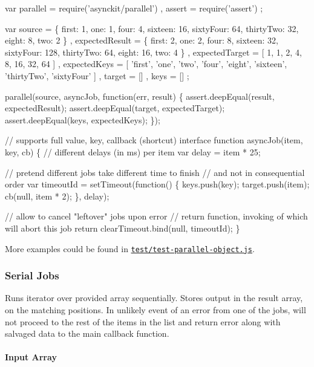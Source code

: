 \begin{DoxyCode}
var parallel = require('asynckit/parallel')
  , assert   = require('assert')
  ;

var source         = \{ first: 1, one: 1, four: 4, sixteen: 16, sixtyFour: 64, thirtyTwo: 32, eight: 8, two:
       2 \}
  , expectedResult = \{ first: 2, one: 2, four: 8, sixteen: 32, sixtyFour: 128, thirtyTwo: 64, eight: 16,
       two: 4 \}
  , expectedTarget = [ 1, 1, 2, 4, 8, 16, 32, 64 ]
  , expectedKeys   = [ 'first', 'one', 'two', 'four', 'eight', 'sixteen', 'thirtyTwo', 'sixtyFour' ]
  , target         = []
  , keys           = []
  ;

parallel(source, asyncJob, function(err, result)
\{
  assert.deepEqual(result, expectedResult);
  assert.deepEqual(target, expectedTarget);
  assert.deepEqual(keys, expectedKeys);
\});

// supports full value, key, callback (shortcut) interface
function asyncJob(item, key, cb)
\{
  // different delays (in ms) per item
  var delay = item * 25;

  // pretend different jobs take different time to finish
  // and not in consequential order
  var timeoutId = setTimeout(function() \{
    keys.push(key);
    target.push(item);
    cb(null, item * 2);
  \}, delay);

  // allow to cancel "leftover" jobs upon error
  // return function, invoking of which will abort this job
  return clearTimeout.bind(null, timeoutId);
\}
\end{DoxyCode}


More examples could be found in \href{test/test-parallel-object.js}{\tt test/test-\/parallel-\/object.\+js}.

\subsubsection*{Serial Jobs}

Runs iterator over provided array sequentially. Stores output in the {\ttfamily result} array, on the matching positions. In unlikely event of an error from one of the jobs, will not proceed to the rest of the items in the list and return error along with salvaged data to the main callback function.

\paragraph*{Input Array}


